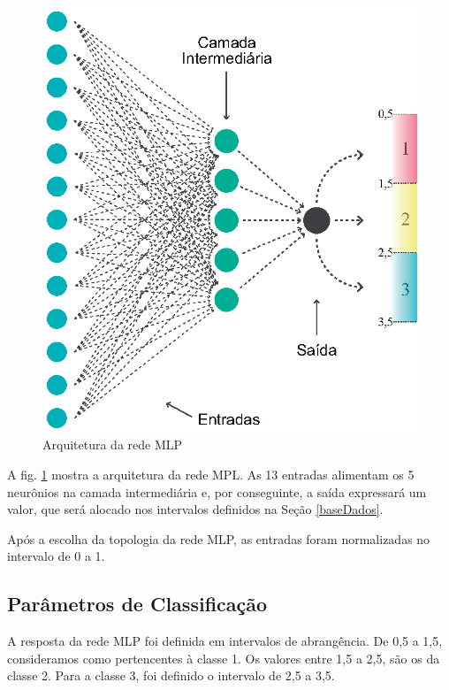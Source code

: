 \begin{figure}[H]

\centering %
\includegraphics{04-Figuras/Arquitetura-MPL}

\caption{Arquitetura da rede MLP}

\label{figura:arquiteturaMPL}

\end{figure}


A fig. \ref{figura:arquiteturaMPL} mostra a arquitetura da rede MPL. As 13 entradas alimentam os 5 neurônios na camada intermediária e, por conseguinte, a saída expressará um valor, que será alocado nos intervalos definidos na Seção \ref{baseDados}.

Após a escolha da topologia da rede MLP, as entradas foram normalizadas no intervalo de 0 a 1.


\subsection{Parâmetros de Classificação}


A resposta da rede MLP foi definida em intervalos de abrangência. De 0,5 a 1,5, consideramos como pertencentes à classe 1. Os valores entre 1,5 a 2,5, são os da classe 2. Para a classe 3, foi definido o intervalo de 2,5 a 3,5.

